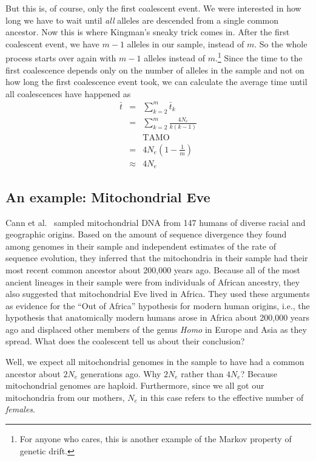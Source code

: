 \documentclass[12pt]{article}
\begin{document}
But this is, of course, only the first coalescent event. We were
interested in how long we have to wait until {\it all\/} alleles are
descended from a single common ancestor. Now this is where Kingman's
sneaky trick comes in. After the first coalescent event, we have $m-1$
alleles in our sample, instead of $m$. So the whole process starts
over again with $m-1$ alleles instead of $m$.\footnote{For anyone who
  cares, this is another example of the Markov property of genetic
  drift.} Since the time to the
first coalescence depends only on the number of alleles in the sample
and not on how long the first coalescence event took, we can calculate
the average time until all coalescences have happened
as
\begin{eqnarray*}
\bar t &=& \sum_{k=2}^m \bar t_k \\
       &=& \sum_{k=2}^m \frac{4N_e}{k(k-1)} \\
       && \mbox{TAMO} \\
       &=& 4N_e\left(1 - \frac{1}{m}\right) \\
       &\approx& 4N_e
\end{eqnarray*}


\subsection*{An example: Mitochondrial
  Eve}

Cann et al.~\cite{Cann-etal-1987} sampled mitochondrial DNA from 147
humans of diverse racial and geographic origins. Based on the amount
of sequence divergence they found among genomes in their sample and
independent estimates of the rate of sequence evolution, they inferred
that the mitochondria in their sample had their most recent common
ancestor about 200,000 years ago. Because all of the most ancient
lineages in their sample were from individuals of African ancestry,
they also suggested that mitochondrial Eve lived in Africa. They used
these arguments as evidence for the ``Out of Africa'' hypothesis for
modern human origins, i.e., the hypothesis that anatomically modern
humans arose in Africa about 200,000 years ago and displaced other
members of the genus {\it Homo\/} in Europe and Asia as they
spread. What does the coalescent tell us about their conclusion?

Well, we expect all mitochondrial genomes in the sample to have had a
common ancestor about $2N_e$ generations ago. Why $2N_e$ rather than
$4N_e$? Because mitochondrial genomes are haploid. Furthermore, since
we all got our mitochondria from our mothers, $N_e$ in this case
refers to the effective number of {\it females}.
\end{document}
